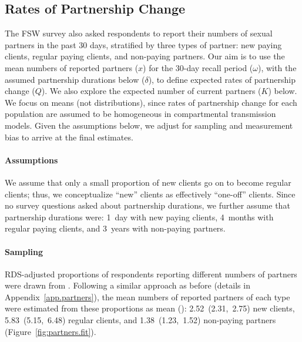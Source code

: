 \subsection{Rates of Partnership Change}\label{meth.partners}
The FSW survey \cite{Baral2014} also asked respondents to report  %
their numbers of sexual partners in the past 30 days,
stratified by three types of partner:
new paying clients, regular paying clients, and non-paying partners.
Our aim is to use the mean numbers of reported partners ($x$) %
for the 30-day recall period ($\omega$),
with the assumed partnership durations below ($\delta$),
to define expected rates of partnership change ($Q$).
We also explore the expected number of current partners ($K$) below. %
We focus on means (not distributions), since
rates of partnership change for each population are assumed to be
homogeneous in compartmental transmission models. %
Given the assumptions below, we adjust for sampling and measurement bias
to arrive at the final estimates.
\paragraph{Assumptions} %
We assume that
only a small proportion of new clients go on to become regular clients;
thus, we conceptualize ``new'' clients as effectively ``one-off'' clients.
Since no survey questions asked about partnership durations,
we further assume that partnership durations were:
1~day with new paying clients,
4~months with regular paying clients, and
3~years with non-paying partners.
\paragraph{Sampling}  %
RDS-adjusted proportions of respondents reporting different numbers of partners
were drawn from \cite{Baral2014}.
Following a similar approach as before (details in Appendix~\ref{app.partners}),
the mean numbers of reported partners of each type
were estimated from these proportions as mean (\ci):
2.52~(2.31,~2.75) new clients,
5.83~(5.15,~6.48) regular clients, and
1.38~(1.23,~1.52) non-paying partners
(Figure~\ref{fig:partners.fit}).
